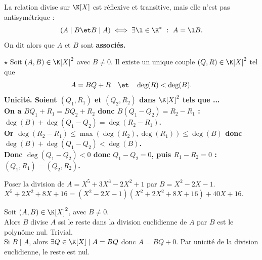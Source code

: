 \documentclass[11pt]{article}
\begin{document}
\vspace*{-0.3cm}

\begin{defi}{}{}
    La relation divise sur $\K[X]$ est réflexive et transitive, mais elle n'est pas antisymétrique :
    \begin{equation*}
        (A \mid B \et B \mid A) \iff \exists \l \in \K^* ~:~ A=\l B.
    \end{equation*}
    On dit alors que $A$ et $B$ sont \bf{associés}.
\end{defi}

\begin{thm}{$\star$}{}
    Soit $(A,B)\in\K[X]^2$ avec $B\neq0$. Il existe un unique couple $(Q,R)\in\K[X]^2$ tel que
    \begin{equation*}
        A=BQ+R \quad\et\quad \deg(R) < \deg(B).
    \end{equation*}
    \tcblower
    \bf{Unicité.} Soient $(Q_1,R_1)$ et $(Q_2,R_2)$ dans $\K[X]^2$ tels que ...\\
    On a $BQ_1+R_1 = BQ_2+R_2$ donc $B(Q_1-Q_2)=R_2-R_1$ : $\deg(B)+\deg(Q_1-Q_2)=\deg(R_2-R_1)$.\\
    Or $\deg(R_2-R_1)\leq\max(\deg(R_2),\deg(R_1))\leq\deg(B)$ donc $\deg(B)+\deg(Q_1-Q_2)<\deg(B)$.\\
    Donc $\deg(Q_1-Q_2)<0$ donc $Q_1-Q_2=0$, puis $R_1-R_2=0$ : $(Q_1,R_1)=(Q_2,R_2)$.
\end{thm}

\begin{ex}{}{}
    Poser la division de $A=X^5+3X^3-2X^2+1$ par $B=X^2-2X-1$.
    \tcblower
    $X^5+2X^2+8X+16=(X^2-2X-1)(X^2+2X^2+8X+16) + 40X + 16$.
\end{ex}

\begin{corr}{}{}
    Soit $(A,B)\in\K[X]^2$, avec $B\neq0$.\\
    Alors $B$ divise $A$ ssi le reste dans la division euclidienne de $A$ par $B$ est le polynôme nul.
    \tcblower
    \boxed{\la} Trivial.\\
    \boxed{\ra} Si $B\mid A$, alors $\exists Q \in \K[X] \mid A = BQ$ donc $A=BQ+0$. Par unicité de la division euclidienne, le reste est nul.
\end{corr}
\end{document}
